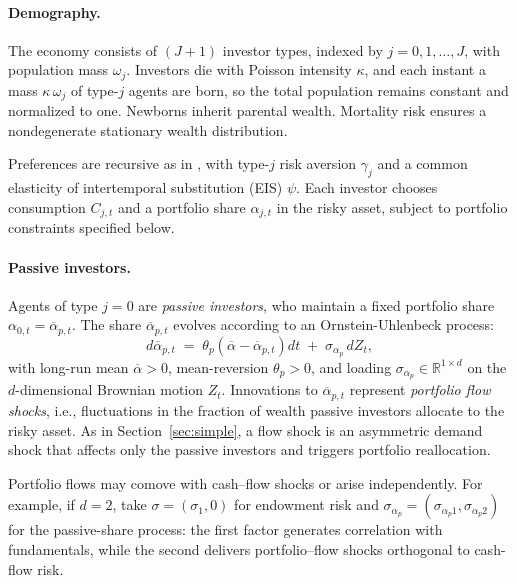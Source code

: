 \paragraph{Demography.}

The economy consists of $(J{+}1)$ investor types, indexed by $j=0,1,\ldots,J$, with population mass $\omega_j$. Investors die with Poisson intensity $\kappa$, and each instant a mass $\kappa\,\omega_j$ of type-$j$ agents are born, so the total population remains constant and normalized to one. Newborns inherit parental wealth. 
Mortality risk ensures a nondegenerate stationary wealth distribution.

Preferences are recursive as in  \citet{duffie1992stochastic}, with type-$j$ risk aversion $\gamma_j$ and a common elasticity of intertemporal substitution (EIS) $\psi$. Each investor chooses consumption $C_{j,t}$ and a portfolio share $\alpha_{j,t}$ in the risky asset, subject to portfolio constraints specified below. 

\paragraph{Passive investors.}
Agents of type $j=0$ are \emph{passive investors}, who maintain a fixed portfolio share $\alpha_{0,t}=\overline{\alpha}_{p,t}$. The share $\overline{\alpha}_{p,t}$ evolves according to an Ornstein-Uhlenbeck process:
\begin{equation}\label{eq:alpha_p_process}
    d\overline{\alpha}_{p,t}
    \;=\;
    \theta_p\!\left(\overline{\alpha}-\overline{\alpha}_{p,t}\right)\!dt
    \;+\;
    \sigma_{\alpha_p}\,dZ_t,
\end{equation}
with long-run mean $\overline{\alpha}>0$, mean-reversion $\theta_p>0$, and loading $\sigma_{\alpha_p}\in\mathbb{R}^{1\times d}$ on the $d$-dimensional Brownian motion $Z_t$. Innovations to $\overline{\alpha}_{p,t}$ represent \emph{portfolio flow shocks}, i.e., fluctuations in the fraction of wealth passive investors allocate to the risky asset. As in Section~\ref{sec:simple}, a flow shock is an asymmetric demand shock that affects only the passive investors and triggers portfolio reallocation.


Portfolio flows may comove with cash–flow shocks or arise independently. For example, if $d=2$, take $\sigma=(\sigma_1,0)$ for endowment risk and $\sigma_{\alpha_p}=(\sigma_{\alpha_p1},\sigma_{\alpha_p2})$ for the passive-share process: the first factor generates correlation with fundamentals, while the second delivers portfolio–flow shocks orthogonal to cash-flow risk.

